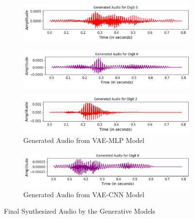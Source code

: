 \documentclass[12pt]{article}
\begin{document}
\begin{figure}[htbp]
    \bigskip
    
    \begin{subfigure}[b]{0.45\linewidth}
        \centering
        \includegraphics[width=\linewidth]{abc3.png}
        \label{fig:sub5}
    \end{subfigure}
    \hfill
    \begin{subfigure}[b]{0.45\linewidth}
        \centering
        \includegraphics[width=\linewidth]{gen6.png}
        \label{fig:sub6}
    \end{subfigure}
    
    \medskip
    
    \begin{subfigure}[b]{0.45\linewidth}
        \centering
        \includegraphics[width=\linewidth]{abc4.png}
        \caption{Generated Audio from VAE-MLP Model}
        \label{fig:sub7}
    \end{subfigure}
    \hfill
    \begin{subfigure}[b]{0.45\linewidth}
        \centering
        \includegraphics[width=\linewidth]{gen8.png}
        \caption{Generated Audio from VAE-CNN Model}
        \label{fig:sub8}
    \end{subfigure}
    
    \caption{Final Synthesized Audio by the Generative Models}
    \label{fig:main_figure}
\end{figure}
\end{document}
